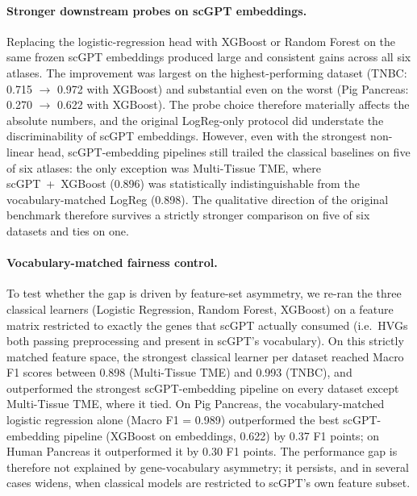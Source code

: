 \documentclass[11pt,a4paper]{article}
\begin{document}
\paragraph{Stronger downstream probes on scGPT embeddings.} Replacing the logistic-regression head with XGBoost or Random Forest on the same frozen scGPT embeddings produced large and consistent gains across all six atlases. The improvement was largest on the highest-performing dataset (TNBC: 0.715 $\rightarrow$ 0.972 with XGBoost) and substantial even on the worst (Pig Pancreas: 0.270 $\rightarrow$ 0.622 with XGBoost). The probe choice therefore materially affects the absolute numbers, and the original LogReg-only protocol did understate the discriminability of scGPT embeddings. However, even with the strongest non-linear head, scGPT-embedding pipelines still trailed the classical baselines on five of six atlases: the only exception was Multi-Tissue TME, where scGPT~+~XGBoost (0.896) was statistically indistinguishable from the vocabulary-matched LogReg (0.898). The qualitative direction of the original benchmark therefore survives a strictly stronger comparison on five of six datasets and ties on one.

\paragraph{Vocabulary-matched fairness control.} To test whether the gap is driven by feature-set asymmetry, we re-ran the three classical learners (Logistic Regression, Random Forest, XGBoost) on a feature matrix restricted to exactly the genes that scGPT actually consumed (i.e.\ HVGs both passing preprocessing and present in scGPT's vocabulary). On this strictly matched feature space, the strongest classical learner per dataset reached Macro F1 scores between 0.898 (Multi-Tissue TME) and 0.993 (TNBC), and outperformed the strongest scGPT-embedding pipeline on every dataset except Multi-Tissue TME, where it tied. On Pig Pancreas, the vocabulary-matched logistic regression alone (Macro F1 = 0.989) outperformed the best scGPT-embedding pipeline (XGBoost on embeddings, 0.622) by 0.37 F1 points; on Human Pancreas it outperformed it by 0.30 F1 points. The performance gap is therefore not explained by gene-vocabulary asymmetry; it persists, and in several cases widens, when classical models are restricted to scGPT's own feature subset.
\end{document}
